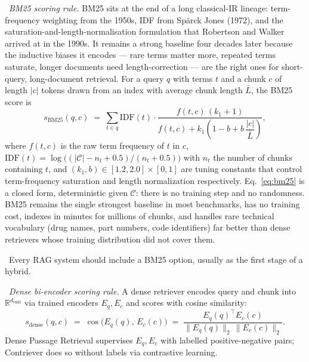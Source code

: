 \Ident\ \emph{BM25 scoring rule.}
BM25 sits at the end of a long classical-IR lineage: term-frequency
weighting from the 1950s, IDF from Sp\"arck Jones (1972), and the
saturation-and-length-normalisation formulation that Robertson and
Walker arrived at in the 1990s. It remains a strong baseline four
decades later because the inductive biases it encodes --- rare
terms matter more, repeated terms saturate, longer documents need
length-correction --- are the right ones for short-query, long-document
retrieval. For a query $q$ with terms $t$ and a chunk $c$ of length
$|c|$ tokens drawn from an index with average chunk length
$\bar{L}$, the BM25 score \citep{robertson2009bm25} is
\begin{equation}
  s_{\mathrm{BM25}}(q, c)
  \;=\;
  \sum_{t \in q}
    \mathrm{IDF}(t) \cdot
    \frac{f(t, c)\,(k_1 + 1)}
         {f(t, c) + k_1\!\left(1 - b + b\,\dfrac{|c|}{\bar{L}}\right)},
  \label{eq:bm25}
\end{equation}
where $f(t, c)$ is the raw term frequency of $t$ in $c$,
$\mathrm{IDF}(t) = \log\!\bigl((|\mathcal{C}| - n_t + 0.5)/(n_t + 0.5)\bigr)$
with $n_t$ the number of chunks containing $t$, and
$(k_1, b) \in [1.2, 2.0] \times [0, 1]$ are tuning constants that
control term-frequency saturation and length normalization
respectively. Eq.~\eqref{eq:bm25} is a closed form, deterministic
given $\mathcal{C}$: there is no training step and no randomness. BM25
remains the single strongest baseline in most benchmarks, has no
training cost, indexes in minutes for millions of chunks, and
handles rare technical vocabulary (drug names, part numbers, code
identifiers) far better than dense retrievers whose training
distribution did not cover them.

\Cons\ Every RAG system should include a BM25 option, usually as
the first stage of a hybrid.

\Ident\ \emph{Dense bi-encoder scoring rule.}
A dense retriever encodes query and chunk into
$\mathbb{R}^{d_\mathrm{emb}}$ via trained encoders $E_q, E_c$ and scores
with cosine similarity:
\begin{equation}
  s_{\mathrm{dense}}(q, c)
  \;=\; \cos\!\bigl(E_q(q),\, E_c(c)\bigr)
  \;=\; \frac{E_q(q)^\top E_c(c)}
             {\|E_q(q)\|_2 \,\|E_c(c)\|_2}.
  \label{eq:dense-cos}
\end{equation}
Dense Passage Retrieval \citep{karpukhin2020dpr} supervises $E_q,
E_c$ with labelled positive-negative pairs; Contriever
\citep{izacard2022contriever} does so without labels via
contrastive learning.

